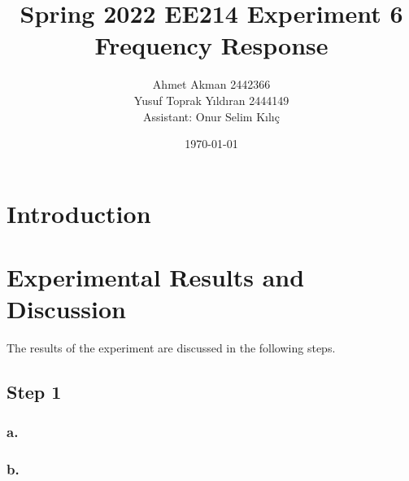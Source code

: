 \documentclass[letterpaper,12pt]{article}
\begin{document}
\thispagestyle{empty}

\title{Spring 2022 EE214 Experiment 6  \protect\\ Frequency Response}
\author{Ahmet Akman 2442366 \protect\\ Yusuf Toprak Yıldıran 2444149 \protect\\ Assistant: Onur Selim Kılıç}
\date{\today}
\maketitle
\tableofcontents
\section{Introduction}

\section{Experimental Results and Discussion}
The results of the experiment are discussed in the following steps.
%
\subsection{Step 1}
\subsubsection{a.}

\subsubsection{b.}
\end{document}
